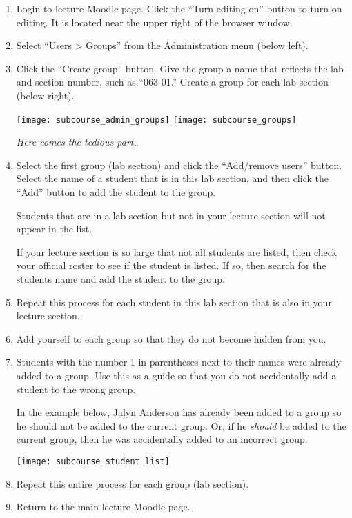 \documentclass[12pt]{article}
\begin{document}
\begin{enumerate}

	\item Login to lecture Moodle page. Click the ``Turn editing on'' button to turn on editing. It is located near the upper right of the browser window.

	\item 	Select “Users \textgreater{} Groups” from the Administration menu (below left).

	\item Click the “Create group” button. Give the group a name that reflects the lab and section number, such as “063-01.” Create a group for each lab section (below right).

	\hfil \texttt{[image: subcourse\_admin\_groups]} \hfil \texttt{[image: subcourse\_groups]} \hfill

	\emph{Here comes the tedious part.}

	\item Select the first group (lab section) and click the “Add/remove users” button. Select the name of a student that is in this lab section, and then click the “Add” button to add the student to the group.
	
	Students that are in a lab section but not in your lecture section will not appear in the list. 
	
	If your lecture section is so large that not all students are listed, then check your official roster to see if the student is listed. If so, then search for the students name and add the student to the group. 

	\item Repeat this process for each student in this lab section that is also in your lecture section.
	
	\item Add yourself to each group so that they do not become hidden from you.
	
	\item Students with the number 1 in parentheses next to their names were already added to a group. Use this as a guide so that you do not accidentally add a student to the wrong group. 
	
	In the example below, Jalyn Anderson has already been added to a group so he should not be added to the current group. Or, if he \emph{should} be added to the current group, then he was accidentally added to an incorrect group.

	{\centering
		\texttt{[image: subcourse\_student\_list]}\par
	}

	\item Repeat this entire process for each group (lab section). 

	\item Return to the main lecture Moodle page.
	
\end{enumerate}
\end{document}
